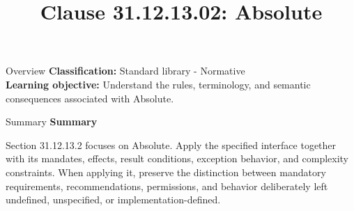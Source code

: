 \documentclass[10pt,letterpaper]{article}
\title{Clause 31.12.13.02: Absolute}
\author{}
\date{}
\begin{document}
\maketitle
\begin{CornellOverviewBox}{Overview}
\textbf{Classification:} Standard library - Normative\\[2pt]
\textbf{Learning objective:} Understand the rules, terminology, and semantic consequences associated with Absolute.
\end{CornellOverviewBox}\begin{CornellSummaryBox}{Summary}
{\sffamily\bfseries\color{Accent} Summary}\par\vspace{3pt}Section 31.12.13.2 focuses on Absolute. Apply the specified interface together with its mandates, effects, result conditions, exception behavior, and complexity constraints. When applying it, preserve the distinction between mandatory requirements, recommendations, permissions, and behavior deliberately left undefined, unspecified, or implementation-defined.
\end{CornellSummaryBox}
\end{document}
